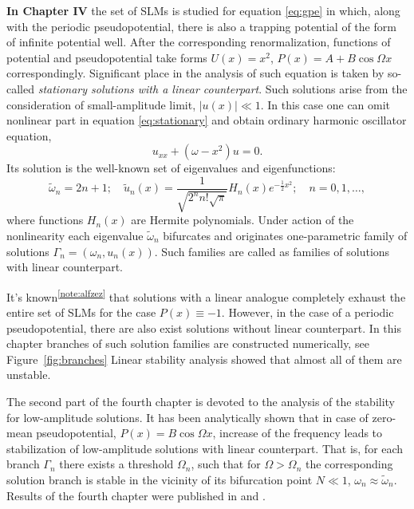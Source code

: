 \documentclass[candidate, href, colorlinks]{disser}
\begin{document}
\textbf{In Chapter IV} the set of SLMs is studied for equation \eqref{eq:gpe} in which, along with the periodic pseudopotential, there is also a trapping potential of the form of infinite potential well.
After the corresponding renormalization, functions of potential and pseudopotential take forms $U(x) = x^2$, $P(x) = A + B \cos \Omega x$ correspondingly.
Significant place in the analysis of such equation is taken by so-called {\it stationary solutions with a linear counterpart}.
Such solutions arise from the consideration of small-amplitude limit, $|u(x)| \ll 1$.
In this case one can omit nonlinear part in equation \eqref{eq:stationary} and obtain ordinary harmonic oscillator equation,
\begin{equation}
	u_{xx} + (\omega - x^2) u = 0.
\end{equation}
Its solution is the well-known set of eigenvalues and eigenfunctions:
\begin{equation}
	\tilde{\omega}_n = 2n + 1; \quad \tilde{u}_n(x) = \dfrac{1}{\sqrt{2^n n! \sqrt{\pi}}} H_n(x) e^{-\frac{1}{2} x^2}; \quad n = 0, 1, \dots,
\label{eq:ho}
\end{equation}
where functions $H_n(x)$ are Hermite polynomials.
Under action of the nonlinearity each eigenvalue $\tilde{\omega}_n$ bifurcates and originates one-parametric family of solutions $\Gamma_n = (\omega_n, u_n(x))$.
Such families are called as families of solutions with linear counterpart. 

It's known\textsuperscript{\ref{note:alfzez}} that solutions with a linear analogue completely exhaust the entire set of SLMs for the case $P(x) \equiv -1$.
However, in the case of a periodic pseudopotential, there are also exist solutions without linear counterpart.
In this chapter branches of such solution families are constructed numerically, see Figure~\ref{fig:branches}
Linear stability analysis showed that almost all of them are unstable.

The second part of the fourth chapter is devoted to the analysis of the stability for low-amplitude solutions.
It has been analytically shown that in case of zero-mean pseudopotential, $P(x) = B \cos \Omega x$, increase of the frequency leads to stabilization of low-amplitude solutions with linear counterpart.
That is, for each branch $\Gamma_n$ there exists a threshold $\Omega_n$, such that for $\Omega > \Omega_n$ the corresponding solution branch is stable in the vicinity of its bifurcation point $N \ll 1$, $\omega_n \approx \tilde{\omega}_n$.
Results of the fourth chapter were published in \cite{AlfimovGegelLebedevMalomedZezyulin} and \cite{Bannoe2018}.
\end{document}
